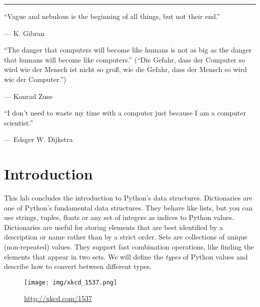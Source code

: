 \documentclass[11pt]{cselabheader}
\title{\thetitle}
\author{\theauthor}
\date{NMT Department of Computer Science and Engineering}
\begin{document}
\maketitle
\hrule

\begin{multicols}{2}
``Vague and nebulous is the beginning of all things, but not their end.''
\begin{flushright}
--- K. Gibran
\end{flushright}


``The danger that computers will become like humans is not as big as the danger
that humans will become like computers.'' (``Die Gefahr, dass der Computer so
wird wie der Mensch ist nicht so gro\ss, wie die Gefahr, dass der Mensch so wird
wie der Computer.'')
\begin{flushright}
--- Konrad Zuse
\end{flushright}

``I don’t need to waste my time with a computer just because I am a computer
scientist.''
\begin{flushright}
--- Edsger W. Dijkstra
\end{flushright}


\section*{Introduction}

This lab concludes the introduction to Python's data structures.  Dictionaries
are one of Python's fundamental data structures.  They behave like lists,
but you can use strings, tuples, floats or any set of integers as indices
to Python values.  Dictionaries are useful for storing elements that are
best identified by a description or name rather than by a strict order.
Sets are collections of unique (non-repeated) values. They support fast
combination operations, like finding the elements that appear in two sets.
We will define the \emph{types} of Python values and describe how to
convert between different types.

\begin{figure}[H]
  \centering
  \texttt{[image: img/xkcd\_1537.png]}
  \caption{\url{http://xkcd.com/1537}}
\end{figure}
\end{multicols}

\newpage

\tableofcontents

\newpage
{}
\end{document}
